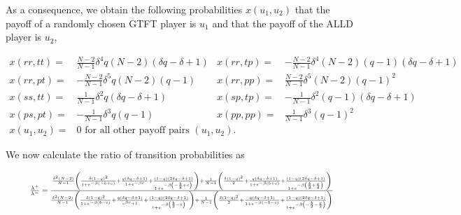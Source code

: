 \documentclass[11pt]{article}
\theoremstyle{plainCl1}
\theoremstyle{plainCl2}
\begin{document}
As a consequence, we obtain the following probabilities \(x(u_1, u_2)\) that the
payoff of a randomly chosen GTFT player is \(u_1\) and that the payoff of the
ALLD player is \(u_2\),

\begin{align*}
  x(rr, tt) = & \frac{N-2}{N - 1} \delta^{4} q \left(N - 2\right) \left(\delta q - \delta + 1\right) &
  x(rr, tp) = & - \frac{N-2}{N - 1} \delta^{4} \left(N - 2\right) \left(q - 1\right) \left(\delta q - \delta + 1\right)\\
  x(rr, pt) = & - \frac{N-2}{N - 1} \delta^{5} q \left(N - 2\right) \left(q - 1\right) &
  x(rr, pp) = & \frac{N-2}{N - 1} \delta^{5} \left(N - 2\right) \left(q - 1\right)^{2}\\
  x(ss, tt) = & \frac{1}{N -1}\delta^{2} q \left(\delta q - \delta + 1\right) & 
  x(sp, tp) = & - \frac{1}{N -1}\delta^{2} \left(q - 1\right) \left(\delta q - \delta + 1\right) \\
  x(ps, pt) = & - \frac{1}{N -1}\delta^{3} q \left(q - 1\right) &
  x(pp, pp) = & \frac{1}{N -1}\delta^{3} \left(q - 1\right)^{2}\\
  x(u_1, u_2) = &  0 \text{ for all other payoff pairs } (u_1, u_2). &
\end{align*}

We now calculate the ratio of transition probabilities as

\begin{equation}
  \resizebox{.9\textwidth}{!}
  {%
  $\frac{\lambda^{+}}{\lambda^{-}} =
  \frac{\frac{\delta^{2} \left(N - 2\right)}{N-1} \left(\frac{\delta \left(1 - q\right)^{2}}{1 + e^{- \beta \left(- b + c\right)}} + \frac{q \left(\delta q - \delta + 1\right)}{1 + e^{- \beta c}} + \frac{\left(1 - q\right) \left(2 \delta q - \delta + 1\right)}{1 + e^{- \beta \left(- \frac{b}{2} + c\right)}}\right) + \frac{1}{N-1}\left(\frac{\delta \left(1 - q\right)^{2}}{2} + \frac{q \left(\delta q - \delta + 1\right)}{1 + e^{- \beta \left(b + c\right)}} + \frac{\left(1 - q\right) \left(2 \delta q - \delta + 1\right)}{1 + e^{- \beta \left(\frac{b}{2} + \frac{c}{2}\right)}}\right)}
  {\frac{\delta^{2} \left(N - 2\right)}{N-1} \left(\frac{\delta \left(1 - q\right)^{2}}{1 + e^{- \beta \left(b - c\right)}} + \frac{q \left(\delta q - \delta + 1\right)}{e^{\beta c} + 1} + \frac{\left(1 - q\right) \left(2 \delta q - \delta + 1\right)}{1 + e^{- \beta \left(\frac{b}{2} - c\right)}}\right) + \frac{1}{N-1} \left(\frac{\delta \left(1 - q\right)^{2}}{2} + \frac{q \left(\delta q - \delta + 1\right)}{1 + e^{- \beta \left(- b - c\right)}} + \frac{\left(1 - q\right) \left(2 \delta q - \delta + 1\right)}{1 + e^{- \beta \left(- \frac{b}{2} - \frac{c}{2}\right)}}\right)}
  $}
\end{equation}
\end{document}
